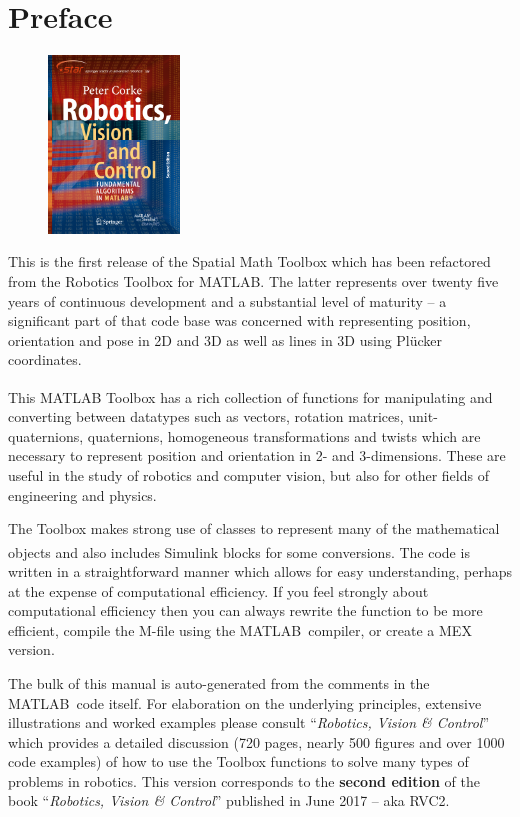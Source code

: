 \documentclass[a4paper,twoside]{report}
\def\Mlab{MATLAB}
\begin{document}
\chapter*{Preface}
\pagestyle{fancyplain}
\begin{figure}
\vspace{-2ex}\includegraphics[width=3.5cm]{figs/frontcover.pdf}
\end{figure}
This is the first release of the Spatial Math Toolbox which has been refactored from the Robotics Toolbox for MATLAB.
The latter represents over twenty five years of continuous
development and a substantial level of maturity -- a significant part of that code base was concerned with representing position, orientation
and pose in 2D and 3D as well as lines in 3D using Pl\"{u}cker coordinates.

This \Mlab\textsuperscript{\textregistered} Toolbox has a rich collection of functions for manipulating and converting between datatypes such as vectors, rotation matrices, unit-quaternions, quaternions, homogeneous transformations and twists which are necessary to represent  position and orientation in 2- and 3-dimensions.
These are useful in the study of robotics and computer vision, but also for other fields of engineering and physics.

The Toolbox makes strong use of classes to represent many of the mathematical objects and also 
includes Simulink\textsuperscript{\textregistered} blocks for some conversions.
The code is written in a straightforward manner which allows
for easy understanding, perhaps at the expense of computational efficiency.
If you feel strongly about computational efficiency then you can always
rewrite the function to be more efficient,
compile the M-file using the \Mlab\   compiler, or
create a MEX version.

The bulk of this manual is auto-generated from the comments in the \Mlab\ code itself.
For elaboration on the underlying principles, extensive illustrations and worked examples please consult
 ``\textit{Robotics, Vision \& Control}''  which provides a detailed discussion (720 pages, nearly 500 figures and over 1000 code examples) of how to use the Toolbox functions to solve many types of problems in robotics.
This version corresponds to the \textbf{second edition} of the book ``\textit{Robotics, Vision \& Control}'' published in June 2017 -- aka RVC2.
\end{document}
